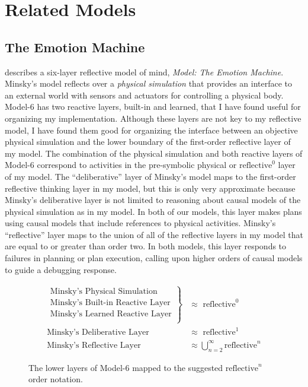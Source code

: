 \chapter{Related Models}
\label{chapter:related_models}

\section{The Emotion Machine}
\label{backreference:self_reflective_self_conscious}

\cite{minsky:2006} describes a six-layer reflective model of mind,
\emph{Model: The Emotion Machine}.  Minsky's model
reflects over a \emph{physical simulation} that provides an interface
to an external world with sensors and actuators for controlling a
physical body.  {\mbox{Model-6}} has two reactive layers, built-in and
learned, that I have found useful for organizing my implementation.
Although these layers are not key to my reflective model, I have found
them good for organizing the interface between an objective physical
simulation and the lower boundary of the first-order reflective layer
of my model.  The combination of the physical simulation and both
reactive layers of {\mbox{Model-6}} correspond to activities in the
pre-symbolic physical or $\text{reflective}^0$ layer of my model.  The
``deliberative'' layer of Minsky's model maps to the first-order
reflective thinking layer in my model, but this is only very
approximate because Minsky's deliberative layer is not limited to
reasoning about causal models of the physical simulation as in my
model.  In both of our models, this layer makes plans using causal
models that include references to physical activities.  Minsky's
``reflective'' layer maps to the union of all of the reflective layers
in my model that are equal to or greater than order two.  In both
models, this layer responds to failures in planning or plan execution,
calling upon higher orders of causal models to guide a debugging
response.

\begin{figure}[bth]
\begin{align*}
\left.
  \begin{array}{l}
    \text{Minsky's Physical Simulation}\\
    \text{Minsky's Built-in Reactive Layer}\\
    \text{Minsky's Learned Reactive Layer}\\
  \end{array}
\right\}                            &{\approx} \text{ reflective}^0 \\
\text{Minsky's Deliberative Layer } &{\approx} \text{ reflective}^1 \\
\text{Minsky's Reflective Layer }   &{\approx} \bigcup_{n=2}^{\infty}{\text{reflective}^n}
\end{align*}
\caption{The lower layers of Model-6 mapped to the suggested
  $\text{reflective}^n$ order notation.}
\label{figure:model_6_as_reflective_order_notation}
\end{figure}

